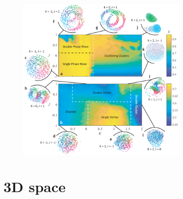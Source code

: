 \documentclass[10pt,aspectratio=43,mathserif,table]{beamer}
\begin{document}
\begin{frame}
    \begin{figure}
        \centering
        \includegraphics[width=0.75\textwidth]{fig6.png}
    \end{figure}
\end{frame}


\section{3D space}
\end{document}
